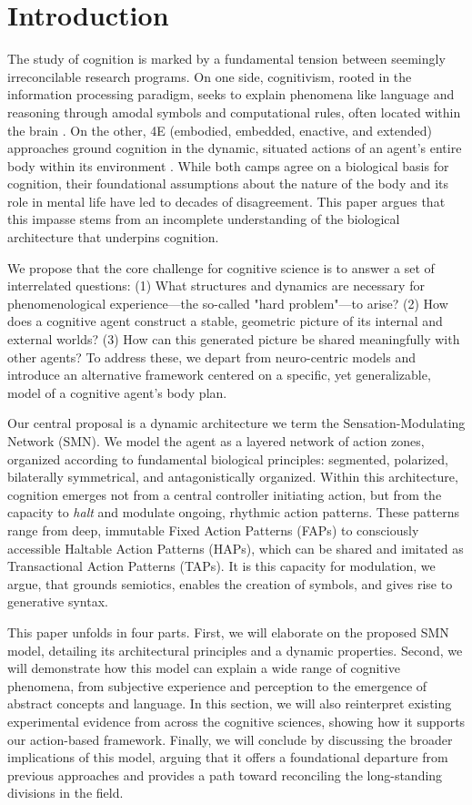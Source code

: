 \documentclass[10pt,letterpaper]{article}
\begin{document}
\section{Introduction}
The study of cognition is marked by a fundamental tension between seemingly irreconcilable research programs. On one side, cognitivism, rooted in the information processing paradigm, seeks to explain phenomena like language and reasoning through amodal symbols and computational rules, often located within the brain \cite{chomsky1965aspects, fodor_modularity_1983}. On the other, 4E (embodied, embedded, enactive, and extended) approaches ground cognition in the dynamic, situated actions of an agent's entire body within its environment \cite{varela, noe_action_2004}. While both camps agree on a biological basis for cognition, their foundational assumptions about the nature of the body and its role in mental life have led to decades of disagreement. This paper argues that this impasse stems from an incomplete understanding of the biological architecture that underpins cognition.

We propose that the core challenge for cognitive science is to answer a set of interrelated questions: (1) What structures and dynamics are necessary for phenomenological experience—the so-called "hard problem"—to arise? (2) How does a cognitive agent construct a stable, geometric picture of its internal and external worlds? (3) How can this generated picture be shared meaningfully with other agents? To address these, we depart from neuro-centric models and introduce an alternative framework centered on a specific, yet generalizable, model of a cognitive agent's body plan.

Our central proposal is a dynamic architecture we term the Sensation-Modulating Network (SMN). We model the agent as a layered network of action zones, organized according to fundamental biological principles: segmented, polarized, bilaterally symmetrical, and antagonistically organized. Within this architecture, cognition emerges not from a central controller initiating action, but from the capacity to \textit{halt} and modulate ongoing, rhythmic action patterns. These patterns range from deep, immutable Fixed Action Patterns (FAPs) to consciously accessible Haltable Action Patterns (HAPs), which can be shared and imitated as Transactional Action Patterns (TAPs). It is this capacity for modulation, we argue, that grounds semiotics, enables the creation of symbols, and gives rise to generative syntax.

This paper unfolds in four parts. First, we will elaborate on the proposed SMN model, detailing its architectural principles and a dynamic properties. Second, we will demonstrate how this model can explain a wide range of cognitive phenomena, from subjective experience and perception to the emergence of abstract concepts and language. In this section, we will also reinterpret existing experimental evidence from across the cognitive sciences, showing how it supports our action-based framework. Finally, we will conclude by discussing the broader implications of this model, arguing that it offers a foundational departure from previous approaches and provides a path toward reconciling the long-standing divisions in the field.
\end{document}
